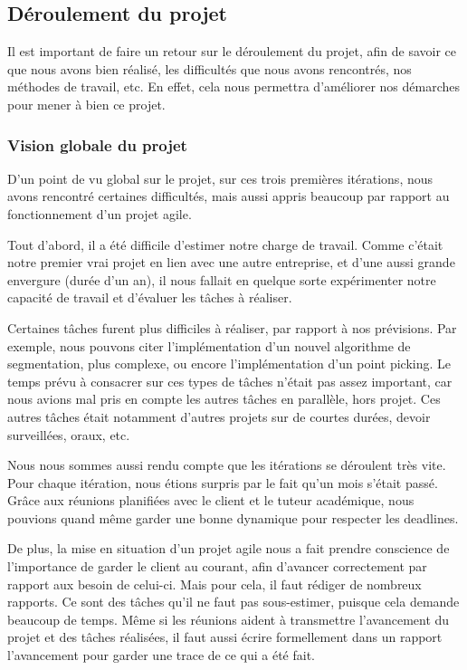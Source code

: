 \documentclass[12pt,titlepage,french]{article}
\begin{document}
\subsection{Déroulement du projet}

Il est important de faire un retour sur le déroulement du projet, afin de savoir ce que nous avons bien réalisé, les difficultés que nous avons rencontrés, nos méthodes de travail, etc. En effet, cela nous permettra d'améliorer nos démarches pour mener à bien ce projet. 

\subsubsection{Vision globale du projet}

D'un point de vu global sur le projet, sur ces trois premières itérations, nous avons rencontré certaines difficultés, mais aussi appris beaucoup par rapport au fonctionnement d'un projet agile.

Tout d'abord, il a été difficile d'estimer notre charge de travail. Comme c'était notre premier vrai projet en lien avec une autre entreprise, et d'une aussi grande envergure (durée d'un an), il nous fallait en quelque sorte expérimenter notre capacité de travail et d'évaluer les tâches à réaliser.

Certaines tâches furent plus difficiles à réaliser, par rapport à nos prévisions. Par exemple, nous pouvons citer l'implémentation d'un nouvel algorithme de segmentation, plus complexe, ou encore l'implémentation d'un point picking. Le temps prévu à consacrer sur ces types de tâches n'était pas assez important, car nous avions mal pris en compte les autres tâches en parallèle, hors projet. Ces autres tâches était notamment d'autres projets sur de courtes durées, devoir surveillées, oraux, etc. \newline

Nous nous sommes aussi rendu compte que les itérations se déroulent très vite. Pour chaque itération, nous étions surpris par le fait qu'un mois s'était passé. Grâce aux réunions planifiées avec le client et le tuteur académique, nous pouvions quand même garder une bonne dynamique pour respecter les deadlines. \newline

De plus, la mise en situation d'un projet agile nous a fait prendre conscience de l'importance de garder le client au courant, afin d'avancer correctement par rapport aux besoin de celui-ci. Mais pour cela, il faut rédiger de nombreux rapports. Ce sont des tâches qu'il ne faut pas sous-estimer, puisque cela demande beaucoup de temps. Même si les réunions aident à transmettre l'avancement du projet et des tâches réalisées, il faut aussi écrire formellement dans un rapport l'avancement pour garder une trace de ce qui a été fait.
\end{document}
